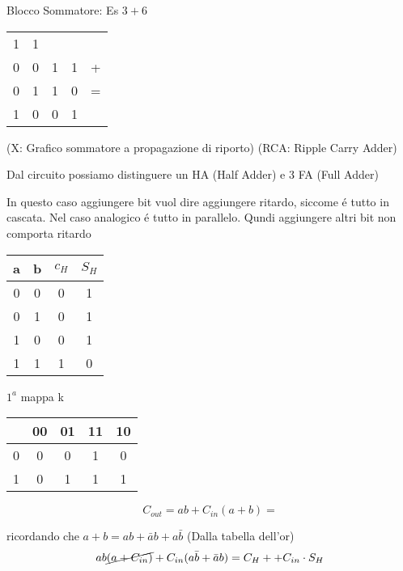 \documentclass{article}
\begin{document}
 Blocco Sommatore: Es $3+6$

 \begin{tabular}{c c c c c}
     1 & 1 & \\
     0 & 0 & 1 & 1 & + \\
     0 & 1 & 1 & 0 & = \\
     \hline
     1 & 0 & 0 & 1
 \end{tabular}

 (X: Grafico sommatore a propagazione di riporto)
 (RCA: Ripple Carry Adder)

 Dal circuito possiamo distinguere un HA (Half Adder) e 3 FA (Full Adder)

In questo caso aggiungere bit vuol dire aggiungere ritardo, siccome \'e tutto in cascata. Nel caso analogico \'e tutto in parallelo. Qundi aggiungere altri bit non comporta ritardo

\begin{tabular}{c c|c c}
    a & b & $c_H$ & $S_H$\\
    \hline
    0 & 0 & 0 & 1 \\
    0 & 1 & 0 & 1 \\
    1 & 0 & 0 & 1 \\
    1 & 1 & 1 & 0
\end{tabular}


$1^a$ mappa k
\begin{center}
    \begin{tabular}{c|c c c c}
    & 00 & 01 & 11 & 10\\
    \hline
        0 & 0 & 0 & 1 & 0\\
        1 & 0 & 1 & 1 & 1\\
    \end{tabular}
\end{center}
\[ C_{out} = ab + C_{in} (a+b) = \]

ricordando che $a + b = ab + \bar{a}b + a\bar{b}$ (Dalla tabella dell'or)
\[ ab \cancel{(a + C_{in})} + C_{in}(a\bar{b} + \bar{a}b) = C_H ++ C_{in} \cdot S_H \]
\end{document}
